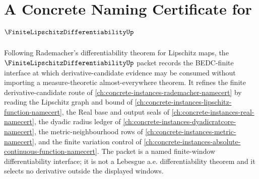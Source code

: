 \chapter{A Concrete Naming Certificate for $\FiniteLipschitzDifferentiabilityUp$}
\label{ch:concrete-instances-finite-lipschitz-differentiability-namecert}

Following Rademacher's differentiability theorem for Lipschitz maps, the $\FiniteLipschitzDifferentiabilityUp$ packet records the BEDC-finite interface at which derivative-candidate evidence may be consumed without importing a measure-theoretic almost-everywhere theorem. It refines the finite derivative-candidate route of \autoref{ch:concrete-instances-rademacher-namecert} by reading the Lipschitz graph and bound of \autoref{ch:concrete-instances-lipschitz-function-namecert}, the Real base and output seals of \autoref{ch:concrete-instances-real-namecert}, the dyadic radius ledger of \autoref{ch:concrete-instances-dyadicratcore-namecert}, the metric-neighbourhood rows of \autoref{ch:concrete-instances-metric-namecert}, and the finite variation control of \autoref{ch:concrete-instances-absolute-continuous-function-namecert}. The packet is a named finite-window differentiability interface; it is not a Lebesgue a.e. differentiability theorem and it selects no derivative outside the displayed windows.

